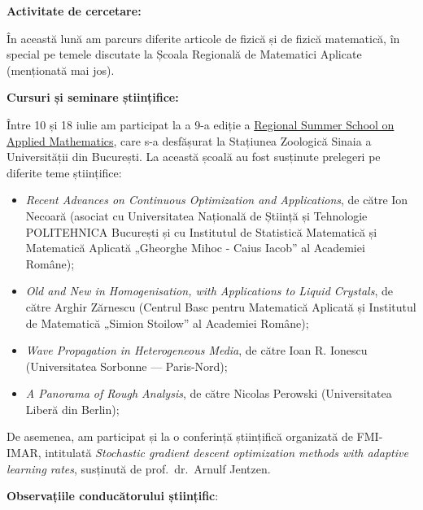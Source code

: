 
\makereportpreamble

\textbf{Activitate de cercetare:}

În această lună am parcurs diferite articole de fizică și de fizică matematică, în special pe temele discutate la Școala Regională de Matematici Aplicate (menționată mai jos).

\textbf{Cursuri și seminare științifice:}

Între 10 și 18 iulie am participat la a 9-a ediție a \href{https://sites.google.com/site/marinliviu/regional-french-romanian-summer-school-on-applied-mathematics/9th-regional-summer-school-on-applied-mathematics-10-18-july-2024?authuser=0}{Regional Summer School on Applied Mathematics}, care s-a desfășurat la Stațiunea Zoologică Sinaia a Universității din București. La această școală au fost susținute prelegeri pe diferite teme științifice:

\begin{itemize}
    \item \emph{Recent Advances on Continuous Optimization and Applications}, de către Ion Necoară (asociat cu Universitatea Națională de Știință și Tehnologie POLITEHNICA București și cu Institutul de Statistică Matematică și Matematică Aplicată „Gheorghe Mihoc - Caius Iacob” al Academiei Române);

    \item \emph{Old and New in Homogenisation, with Applications to Liquid Crystals}, de către Arghir Zărnescu (Centrul Basc pentru Matematică Aplicată și Institutul de Matematică „Simion Stoilow” al Academiei Române);

    \item \emph{Wave Propagation in Heterogeneous Media}, de către Ioan R. Ionescu (Universitatea Sorbonne --- Paris-Nord);

    \item \emph{A Panorama of Rough Analysis}, de către Nicolas Perowski (Universitatea Liberă din Berlin);
\end{itemize}

De asemenea, am participat și la o conferință științifică organizată de FMI-IMAR, intitulată \emph{Stochastic gradient descent optimization methods with adaptive learning rates}, susținută de prof.~dr.~Arnulf Jentzen.

\vspace{0.5em}

\textbf{Observațiile conducătorului științific}:

\vspace{3em}

